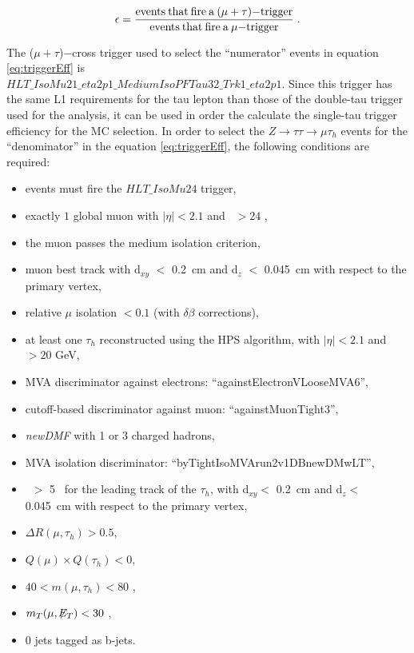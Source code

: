 \begin{equation}\label{eq:triggerEff}
\epsilon = \frac{\rm{events\>that\>fire\>a\>}(\mu+\tau)\rm{-trigger}}{\rm{events\>that\>fire\>a\>}\mu\rm{-trigger}}\; . \\
\end{equation}

\noindent The ($\mu+\tau$)$-$cross trigger used to select the ``numerator'' events in equation \ref{eq:triggerEff} is \\
$HLT\_IsoMu21\_eta2p1\_MediumIsoPFTau32\_Trk1\_eta2p1$. Since this trigger has the same L1 requirements 
for the tau lepton than those of the double-tau trigger used for the analysis, it can be used 
in order the calculate the single-tau trigger efficiency for the MC selection. In order to 
select the $Z \rightarrow \tau\tau \rightarrow \mu\tau_{h}$ events for the ``denominator'' 
in the equation \ref{eq:triggerEff}, the following conditions are required:

\begin{itemize}
  \item events must fire the $HLT{\_}IsoMu24$ trigger,
  \item exactly $1$ global muon with $|\eta| < 2.1$ and \pt~$> 24$ \GeV,
  \item the muon passes the medium isolation criterion,
  \item muon best track with d$_{xy}$ $<$ 0.2~cm and d$_{z}$ $<$ 0.045~cm with respect to the primary vertex,
  \item relative $\mu$ isolation $< 0.1$ (with $\delta\beta$ corrections),
  \item at least one $\tau_{h}$ reconstructed using the HPS algorithm, with $|\eta| < 2.1$ and \pt~$> 20$ GeV,
  \item MVA discriminator against electrons: ``againstElectronVLooseMVA6'',
  \item cutoff-based discriminator against muon: ``againstMuonTight3'',
   \item \textit{newDMF} with 1 or 3 charged hadrons, %
  \item MVA isolation discriminator: ``byTightIsoMVArun2v1DBnewDMwLT'',
  \item \pt~$>$ 5 \GeV~for the leading track of the $\tau_{h}$, with d$_{xy} <$ 0.2~cm 
  and d$_{z} <$ 0.045~cm with respect to the primary vertex,
  \item $\Delta R(\mu,\tau_{h}) > 0.5$,
  \item $Q(\mu) \times Q(\tau_{h}) < 0 $,
  \item $40 < m(\mu, \tau_{h}) < 80$ \GeV,
  \item $m_{T}(\mu,\not\!\!E_T) < 30$ \GeV,
  \item 0 jets tagged as b-jets.
\end{itemize}

